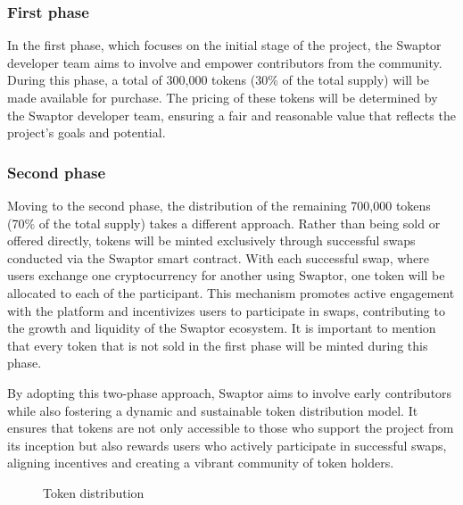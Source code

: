 \documentclass[12pt]{article}
\begin{document}
\subsubsection{First phase}
In the first phase, which focuses on the initial stage of the project, the Swaptor developer team aims to involve
and empower contributors from the community. During this phase, a total of 300,000 tokens
(30\% of the total supply) will be made available for purchase.
The pricing of these tokens will be determined by the Swaptor developer team, ensuring a fair and reasonable value
that reflects the project's goals and potential.

\subsubsection{Second phase}
Moving to the second phase, the distribution of the remaining 700,000 tokens
(70\% of the total supply) takes a different approach. Rather than being sold or offered directly,
tokens will be minted exclusively through successful swaps conducted via the Swaptor smart contract.
With each successful swap, where users exchange one cryptocurrency for another using Swaptor,
one token will be allocated to each of the participant. This mechanism promotes active engagement with the platform
and incentivizes users to participate in swaps, contributing to the growth and liquidity of the Swaptor ecosystem.
It is important to mention that every token that is not sold in the first phase will be minted during this phase.

\vspace{1.5cc}
By adopting this two-phase approach, Swaptor aims to involve early contributors while also fostering
a dynamic and sustainable token distribution model. It ensures that tokens are not only accessible to
those who support the project from its inception but also rewards users who actively participate in successful swaps,
aligning incentives and creating a vibrant community of token holders.

\vspace{2cc}

\begin{figure}[h]
  \centering
  \caption{Token distribution}
  \label{fig:pie-chart}
\end{figure}


\newpage
\end{document}
